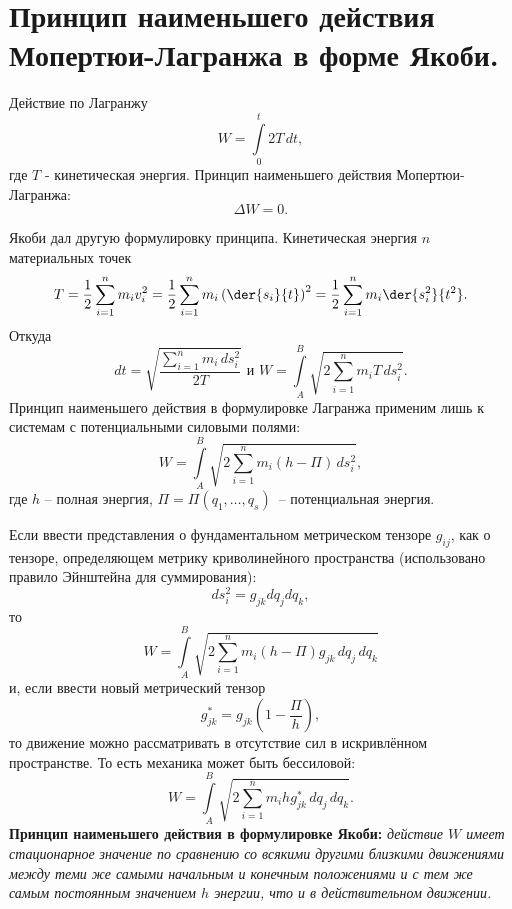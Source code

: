 \chapter{Принцип наименьшего действия Мопертюи-Лагранжа в форме Якоби.}

Действие по Лагранжу
\[
    W = \int\limits_{0}^t 2T\,dt,
\]
где \( T \) - кинетическая энергия. Принцип наименьшего действия
Мопертюи-Лагранжа:
\[
    \Delta W = 0.
\]

Якоби дал другую формулировку принципа. Кинетическая энергия \( n \)
материальных точек
\[
    T = \frac{1}{2}\sum\limits_{i=1}^{n} m_i v_i^2 = 
    \frac{1}{2}\sum\limits_{i=1}^{n} m_i \left(\der{s_i}{t}\right)^2 = 
    \frac{1}{2}\sum\limits_{i=1}^{n} m_i \der{s_i^2}{t^2}.
\]
Откуда 
\[
    dt = \sqrt{\frac{\sum\limits_{i=1}^{n} m_i\,ds_i^2}{2T}} \text{ и }
    W = \int\limits_{A}^B \sqrt{{2\sum\limits_{i=1}^{n} m_i T\,ds_i^2}}.
\]
Принцип наименьшего действия в формулировке Лагранжа применим лишь к системам
с потенциальными силовыми полями:
\[
    W = \int\limits_{A}^B \sqrt{{2\sum\limits_{i=1}^{n} m_i {(h-\Pi)}\,ds_i^2}},
\]
где \( h \) -- полная энергия, \( \Pi = \Pi(q_1, \dots, q_s) \)~--
потенциальная энергия.

Если ввести представления о фундаментальном метрическом тензоре \( g_{ij} \),
как о тензоре, определяющем метрику криволинейного пространства 
(использовано правило Эйнштейна для суммирования):
\[
    ds_i^2 = g_{jk}dq_jdq_k,
\]
то 
\[
    W = \int\limits_{A}^B
    \sqrt{{2\sum\limits_{i=1}^{n} m_i (h-\Pi) g_{jk}\,dq_j\,dq_k}}
\]
и, если ввести новый метрический тензор
\[
    g_{jk}^* = g_{jk}\left(1-\frac{\Pi}{h}\right),
\]
то движение можно рассматривать в отсутствие сил в искривлённом пространстве.
То есть механика может быть бессиловой:
\[
    W = \int\limits_{A}^B
    \sqrt{{2\sum\limits_{i=1}^{n} m_i h g_{jk}^*\,dq_j\,dq_k}}.
\] 
\textbf{Принцип наименьшего действия в формулировке Якоби:}
\emph{действие \( W \) имеет стационарное значение по сравнению со всякими
другими близкими движениями между теми же самыми начальным и
конечным положениями и с тем же самым постоянным значением \( h \) энергии,
что и в действительном движении.}
\newpage
